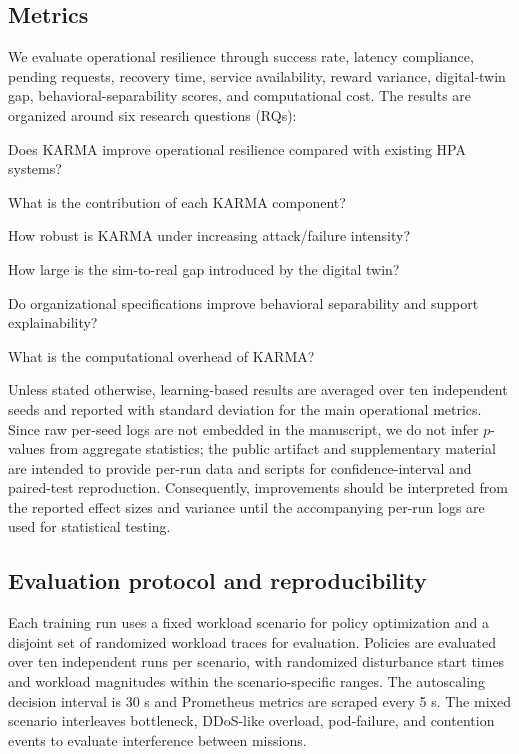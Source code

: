 \documentclass[journal]{IEEEtran}
\begin{document}
\subsection{Metrics}

We evaluate operational resilience through success rate, latency compliance, pending requests, recovery time, service availability, reward variance, digital-twin gap, behavioral-separability scores, and computational cost. The results are organized around six research questions (RQs):
\begin{enumerate*}[label=\textbf{RQ\arabic*:}, itemjoin={;\quad }]
  \item Does KARMA improve operational resilience compared with existing HPA systems?
  \item What is the contribution of each KARMA component?
  \item How robust is KARMA under increasing attack/failure intensity?
  \item How large is the sim-to-real gap introduced by the digital twin?
  \item Do organizational specifications improve behavioral separability and support explainability?
  \item What is the computational overhead of KARMA?
\end{enumerate*}
Unless stated otherwise, learning-based results are averaged over ten independent seeds and reported with standard deviation for the main operational metrics. Since raw per-seed logs are not embedded in the manuscript, we do not infer $p$-values from aggregate statistics; the public artifact and supplementary material are intended to provide per-run data and scripts for confidence-interval and paired-test reproduction. Consequently, improvements should be interpreted from the reported effect sizes and variance until the accompanying per-run logs are used for statistical testing.

\subsection{Evaluation protocol and reproducibility}

Each training run uses a fixed workload scenario for policy optimization and a disjoint set of randomized workload traces for evaluation. Policies are evaluated over ten independent runs per scenario, with randomized disturbance start times and workload magnitudes within the scenario-specific ranges. The autoscaling decision interval is 30 s and Prometheus metrics are scraped every 5 s. The mixed scenario interleaves bottleneck, DDoS-like overload, pod-failure, and contention events to evaluate interference between missions.
\end{document}
